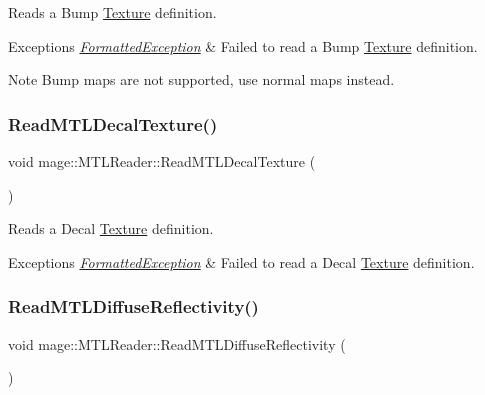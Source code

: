 Reads a Bump \hyperlink{classmage_1_1_texture}{Texture} definition.


\begin{DoxyExceptions}{Exceptions}
{\em \hyperlink{structmage_1_1_formatted_exception}{Formatted\+Exception}} & Failed to read a Bump \hyperlink{classmage_1_1_texture}{Texture} definition. \\
\hline
\end{DoxyExceptions}
\begin{DoxyNote}{Note}
Bump maps are not supported, use normal maps instead. 
\end{DoxyNote}
\hypertarget{classmage_1_1_m_t_l_reader_a578df3a55c79fba9d46616791b2e5539}{}\label{classmage_1_1_m_t_l_reader_a578df3a55c79fba9d46616791b2e5539} 
\subsubsection{\texorpdfstring{Read\+M\+T\+L\+Decal\+Texture()}{ReadMTLDecalTexture()}}
{\footnotesize\ttfamily void mage\+::\+M\+T\+L\+Reader\+::\+Read\+M\+T\+L\+Decal\+Texture (\begin{DoxyParamCaption}{ }\end{DoxyParamCaption})\hspace{0.3cm}{\ttfamily [private]}}

Reads a Decal \hyperlink{classmage_1_1_texture}{Texture} definition.


\begin{DoxyExceptions}{Exceptions}
{\em \hyperlink{structmage_1_1_formatted_exception}{Formatted\+Exception}} & Failed to read a Decal \hyperlink{classmage_1_1_texture}{Texture} definition. \\
\hline
\end{DoxyExceptions}
\hypertarget{classmage_1_1_m_t_l_reader_accd087a8e5b2d489b83f70ecf0fe0d18}{}\label{classmage_1_1_m_t_l_reader_accd087a8e5b2d489b83f70ecf0fe0d18} 
\subsubsection{\texorpdfstring{Read\+M\+T\+L\+Diffuse\+Reflectivity()}{ReadMTLDiffuseReflectivity()}}
{\footnotesize\ttfamily void mage\+::\+M\+T\+L\+Reader\+::\+Read\+M\+T\+L\+Diffuse\+Reflectivity (\begin{DoxyParamCaption}{ }\end{DoxyParamCaption})\hspace{0.3cm}{\ttfamily [private]}}

